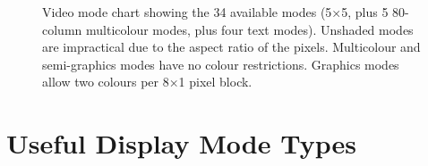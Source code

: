 
\begin{figure}
 \centering
 
 \caption[Video Modes]{\label{fig:video-modes} Video mode chart showing the 34
   available modes (5×5, plus 5 80-column multicolour modes, plus four text
   modes). Unshaded modes are impractical due to the aspect ratio of the
   pixels. Multicolour and semi-graphics modes have no colour
   restrictions. Graphics modes allow two colours per 8×1 pixel block.}
\end{figure}




\section{Useful Display Mode Types}

